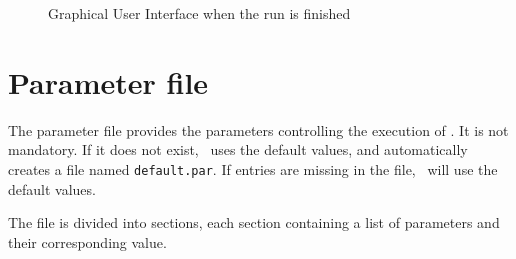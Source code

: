 \documentclass[12pt]{memoir}
\begin{document}
\begin{figure}[htbf]
\begin{center}
\caption{\label{fig:gui1}Graphical User Interface when the run is finished}
\end{center}

\end{figure}


\section{Parameter file}
\label{sec:parameter}

The parameter file  provides the parameters controlling the
execution of \BIOGEME. It is not mandatory. If it does not exist, \BIOGEME\ uses the default values, and automatically creates a file named \verb+default.par+.
If entries are missing in the file, \BIOGEME\ will use the default values.

The file is divided into sections, each section containing a list of
parameters and their corresponding value.
\end{document}
